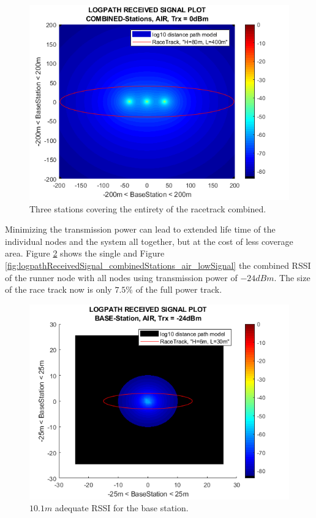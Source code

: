 \begin{figure}[H]
	\centering
	\includegraphics[width=\linewidth]{theory/pathLoss/fig/logpathReceivedSignal_combinedStations_air_highSignal.png}
	\caption{Three stations covering the entirety of the racetrack combined.}
	\label{fig:logpathReceivedSignal_combinedStations_air_highSignal}
\end{figure}

Minimizing the transmission power can lead to extended life time of the individual nodes and the system all together, but at the cost of less coverage area. Figure \ref{fig:logpathReceivedSignal_baseStation_air_lowSignal} shows the single and Figure \ref{fig:logpathReceivedSignal_combinedStations_air_lowSignal} the combined RSSI of the runner node with all nodes using transmission power of $-24dBm$. The size of the race track now is only $7.5\%$ of the full power track. 

\begin{figure}[H]
	\centering
	\includegraphics[width=\linewidth]{theory/pathLoss/fig/logpathReceivedSignal_baseStation_air_lowSignal.png}
	\caption{$10.1m$ adequate RSSI for the base station.}
	\label{fig:logpathReceivedSignal_baseStation_air_lowSignal}
\end{figure}

